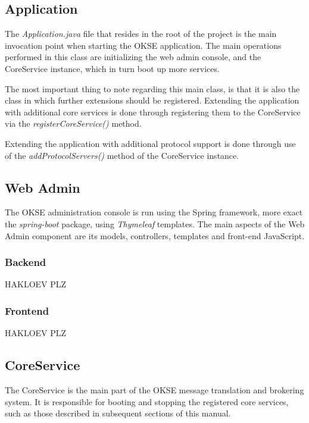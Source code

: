 \subsection{Application}

The \textit{Application.java} file that resides in the root of the project is the main invocation point when starting the OKSE application. The main operations performed in this class are initializing the web admin console, and the CoreService instance, which in turn boot up more services.

The most important thing to note regarding this main class, is that it is also the class in which further extensions should be registered. Extending the application with additional core services is done through registering them to the CoreService via the \textit{registerCoreService()} method.

Extending the application with additional protocol support is done through use of the \textit{addProtocolServers()} method of the CoreService instance.

\subsection{Web Admin}

The OKSE administration console is run using the Spring framework, more exact the \textit{spring-boot} package, using \textit{Thymeleaf} templates. The main aspects of the Web Admin component are its models, controllers, templates and front-end JavaScript.

\subsubsection{Backend}

HAKLOEV PLZ

\subsubsection{Frontend}

HAKLOEV PLZ

\subsection{CoreService}

The CoreService is the main part of the OKSE message translation and brokering system. It is responsible for booting and stopping the registered core services, such as those described in subsequent sections of this manual.

